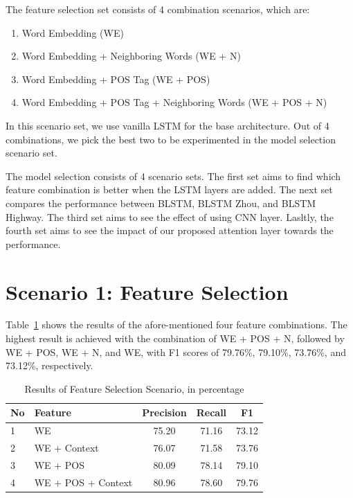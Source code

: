 The feature selection set consists of 4 combination scenarios, which are:
\begin{enumerate}
	\item Word Embedding (WE)
	\item Word Embedding + Neighboring Words (WE + N)
	\item Word Embedding + POS Tag (WE + POS)
	\item Word Embedding + POS Tag + Neighboring Words (WE + POS + N)
\end{enumerate}

In this scenario set, we use vanilla LSTM for the base architecture. Out of 4 combinations, we pick the best two to be experimented in the model selection scenario set.

The model selection consists of 4 scenario sets. The first set aims to find which feature combination is better when the LSTM layers are added. The next set compares the performance between BLSTM, BLSTM Zhou, and BLSTM Highway. The third set aims to see the effect of using CNN layer. Lasltly, the fourth set aims to see the impact of our proposed attention layer towards the performance.

\section{Scenario 1: Feature Selection}
Table~\ref{tab:feature_scenario} shows the results of the afore-mentioned four feature combinations. The highest result is achieved with the combination of WE + POS + N, followed by WE + POS, WE + N, and WE, with F1 scores of 79.76\%, 79.10\%, 73.76\%, and 73.12\%, respectively. 

\begin{table}
	\centering
	\caption{Results of Feature Selection Scenario, in percentage}
	\label{tab:feature_scenario}
	\begin{tabular}{llccc}
		\hline
		No & Feature & Precision & Recall & F1 \\
		\hline\hline
		1 & WE & 75.20 & 71.16 & 73.12 \\
		2 & WE + Context & 76.07 & 71.58 & 73.76 \\
		3 & WE + POS & 80.09 & 78.14 & 79.10 \\
		4 & WE + POS + Context & 80.96 & 78.60 & 79.76 \\
		\hline
	\end{tabular}

\end{table}

